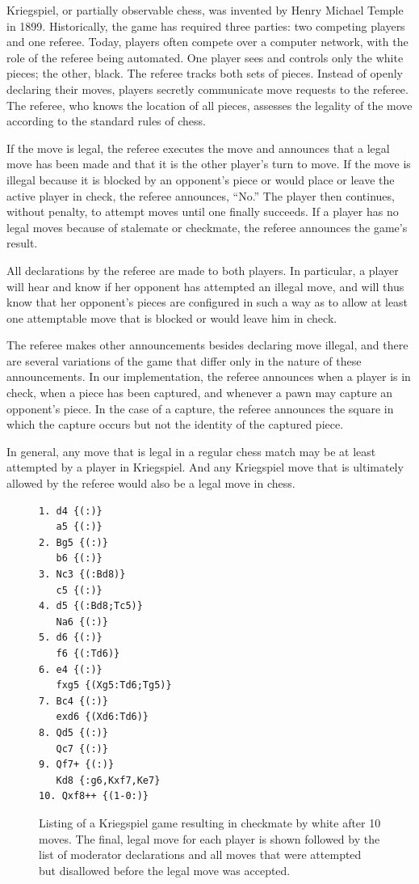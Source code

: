 \documentclass[10pt, conference, compsocconf]{IEEEtran}
\begin{document}
Kriegspiel, or partially observable chess,  was invented by Henry Michael
Temple in 1899.  Historically, the game has required three parties: two
competing players and one referee.  Today, players often compete over a
computer network, with the role of the referee being automated.  One player
sees and controls only the white pieces; the other, black.  The referee tracks
both sets of pieces.  Instead of openly declaring their moves, players secretly
communicate move requests to the referee.  The referee, who knows the location
of all pieces, assesses the legality of the move according to the standard
rules of chess.  

If the move is legal, the referee executes the move and announces that a
legal move has been made and that it is the other player's turn to move.  If
the move is illegal because it is blocked by an opponent's piece or would place
or leave the active player in check, the referee announces, ``No.''  The player
then continues, without penalty, to attempt moves until one finally succeeds.
If a player has no legal moves because of stalemate or checkmate, the referee
announces the game's result.

All declarations by the referee are made to both players.  In
particular, a player will hear and know if her opponent has attempted an
illegal move, and will thus know that her opponent's pieces are configured in
such a way as to allow at least one attemptable move that is blocked or would
leave him in check.  

The referee makes other announcements besides declaring move illegal, and there
are several variations of the game that differ only in the nature of these
announcements.  In our implementation, the referee announces when a player is
in check, when a piece has been captured, and whenever a pawn may capture an
opponent's piece.  In the case of a capture, the referee announces the square
in which the capture occurs but not the identity of the captured piece.

In general, any move that is legal in a regular chess match may be at least
attempted by a player in Kriegspiel.  And any Kriegspiel move that is
ultimately allowed by the referee would also be a legal move in chess.    

\begin{figure}
\begin{center}
\begin{verbatim}
1. d4 {(:)}
   a5 {(:)}
2. Bg5 {(:)}
   b6 {(:)}
3. Nc3 {(:Bd8)}
   c5 {(:)}
4. d5 {(:Bd8;Tc5)}
   Na6 {(:)}
5. d6 {(:)}
   f6 {(:Td6)}
6. e4 {(:)}
   fxg5 {(Xg5:Td6;Tg5)}
7. Bc4 {(:)}
   exd6 {(Xd6:Td6)}
8. Qd5 {(:)}
   Qc7 {(:)}
9. Qf7+ {(:)} 
   Kd8 {:g6,Kxf7,Ke7}
10. Qxf8++ {(1-0:)}
\end{verbatim}
\end{center}
\caption{Listing of a Kriegspiel game resulting in checkmate by white after 10 moves. The final, legal move for each player is shown followed by the list of moderator declarations and all moves that were attempted but disallowed before the legal move was accepted.}
\label{listing}
\vspace{-0.1in}
\end{figure}
\end{document}
